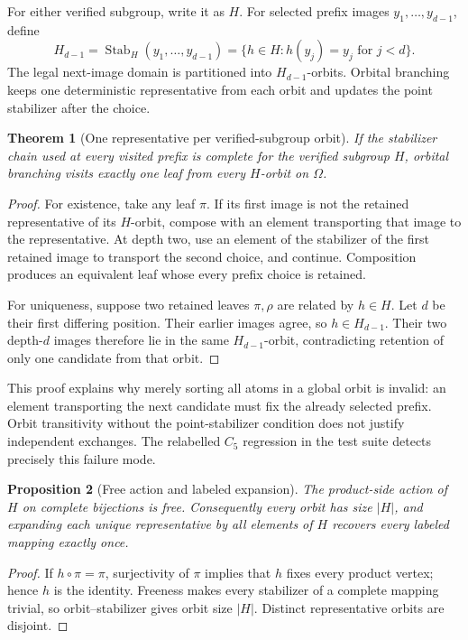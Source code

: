 \documentclass[11pt]{article}
\newtheorem{theorem}{Theorem}[section]
\newtheorem{proposition}[theorem]{Proposition}
\theoremstyle{definition}
\newcommand{\Stab}{\operatorname{Stab}}
\begin{document}
For either verified subgroup, write it as \(H\).  For selected prefix images
\(y_1,\ldots,y_{d-1}\), define
\[
 H_{d-1}=\Stab_H(y_1,\ldots,y_{d-1})
 =\{h\in H:h(y_j)=y_j\text{ for }j<d\}.
\]
The legal next-image domain is partitioned into \(H_{d-1}\)-orbits.  Orbital
branching keeps one deterministic representative from each orbit and updates
the point stabilizer after the choice.

\begin{theorem}[One representative per verified-subgroup orbit]
If the stabilizer chain used at every visited prefix is complete for the
verified subgroup \(H\), orbital branching visits exactly one leaf from every
\(H\)-orbit on \(\Omega\).
\label{thm:si-orbital}
\end{theorem}

\begin{proof}
For existence, take any leaf \(\pi\).  If its first image is not the retained
representative of its \(H\)-orbit, compose with an element transporting that
image to the representative.  At depth two, use an element of the stabilizer
of the first retained image to transport the second choice, and continue.
Composition produces an equivalent leaf whose every prefix choice is
retained.

For uniqueness, suppose two retained leaves \(\pi,\rho\) are related by
\(h\in H\).  Let \(d\) be their first differing position.  Their earlier
images agree, so \(h\in H_{d-1}\).  Their two depth-\(d\) images therefore lie
in the same \(H_{d-1}\)-orbit, contradicting retention of only one candidate
from that orbit.
\end{proof}

This proof explains why merely sorting all atoms in a global orbit is invalid:
an element transporting the next candidate must fix the already selected
prefix.  Orbit transitivity without the point-stabilizer condition does not
justify independent exchanges.  The relabelled \(C_5\) regression in the test
suite detects precisely this failure mode.

\begin{proposition}[Free action and labeled expansion]
The product-side action of \(H\) on complete bijections is free.  Consequently
every orbit has size \(|H|\), and expanding each unique representative by all
elements of \(H\) recovers every labeled mapping exactly once.
\end{proposition}

\begin{proof}
If \(h\circ\pi=\pi\), surjectivity of \(\pi\) implies that \(h\) fixes every
product vertex; hence \(h\) is the identity.  Freeness makes every stabilizer
of a complete mapping trivial, so orbit--stabilizer gives orbit size \(|H|\).
Distinct representative orbits are disjoint.
\end{proof}
\end{document}
